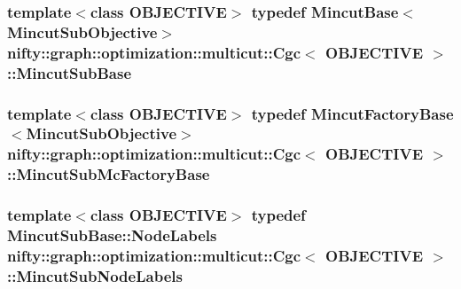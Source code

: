 \subsubsection[{Mincut\+Sub\+Base}]{\setlength{\rightskip}{0pt plus 5cm}template$<$class O\+B\+J\+E\+C\+T\+I\+V\+E$>$ typedef {\bf Mincut\+Base}$<${\bf Mincut\+Sub\+Objective}$>$ {\bf nifty\+::graph\+::optimization\+::multicut\+::\+Cgc}$<$ O\+B\+J\+E\+C\+T\+I\+V\+E $>$\+::{\bf Mincut\+Sub\+Base}}\label{classnifty_1_1graph_1_1optimization_1_1multicut_1_1Cgc_acc73bcc6196a77bd128d62999de28181}
\hypertarget{classnifty_1_1graph_1_1optimization_1_1multicut_1_1Cgc_a73eaf6193f5822782a586aa890d3f05a}{}
\subsubsection[{Mincut\+Sub\+Mc\+Factory\+Base}]{\setlength{\rightskip}{0pt plus 5cm}template$<$class O\+B\+J\+E\+C\+T\+I\+V\+E$>$ typedef {\bf Mincut\+Factory\+Base}$<${\bf Mincut\+Sub\+Objective}$>$ {\bf nifty\+::graph\+::optimization\+::multicut\+::\+Cgc}$<$ O\+B\+J\+E\+C\+T\+I\+V\+E $>$\+::{\bf Mincut\+Sub\+Mc\+Factory\+Base}}\label{classnifty_1_1graph_1_1optimization_1_1multicut_1_1Cgc_a73eaf6193f5822782a586aa890d3f05a}
\hypertarget{classnifty_1_1graph_1_1optimization_1_1multicut_1_1Cgc_a6d0c73820ef02657096a50dd6f115201}{}
\subsubsection[{Mincut\+Sub\+Node\+Labels}]{\setlength{\rightskip}{0pt plus 5cm}template$<$class O\+B\+J\+E\+C\+T\+I\+V\+E$>$ typedef {\bf Mincut\+Sub\+Base\+::\+Node\+Labels} {\bf nifty\+::graph\+::optimization\+::multicut\+::\+Cgc}$<$ O\+B\+J\+E\+C\+T\+I\+V\+E $>$\+::{\bf Mincut\+Sub\+Node\+Labels}}\label{classnifty_1_1graph_1_1optimization_1_1multicut_1_1Cgc_a6d0c73820ef02657096a50dd6f115201}
\hypertarget{classnifty_1_1graph_1_1optimization_1_1multicut_1_1Cgc_a69d467869906adbb17d20768c6e9d6a5}{}
